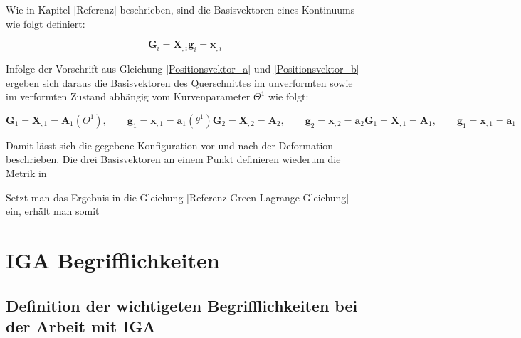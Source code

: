 \documentclass[german,a4paper,12pt,oneside]{scrbook}
\theoremstyle{definition}
\theoremstyle{definition}
\theoremstyle{definition}
\theoremstyle{definition}
\theoremstyle{definition}
\theoremstyle{definition}
\begin{document}
Wie in Kapitel [Referenz] beschrieben, sind die Basisvektoren eines Kontinuums wie folgt definiert:

\begin{subequations}
    \begin{equation}
        \bm{G}_i = \bm{X}_{,i}
    \end{equation}
    \begin{equation}
        \bm{g}_i = \bm{x}_{,i}
    \end{equation}
\end{subequations}

Infolge der Vorschrift aus Gleichung \eqref{Positionsvektor_a} und \eqref{Positionsvektor_b} ergeben sich daraus die Basisvektoren des Querschnittes im unverformten sowie im verformten Zustand abhängig vom Kurvenparameter $\Theta^1$ wie folgt: 

\begin{subequations}
    \begin{equation}
        \bm{G}_1 = \bm{X}_{,1} = \bm{A}_1(\Theta^1), \qquad     
        \bm{g}_1 = \bm{x}_{,1} = \bm{a}_1(\theta^1)
    \end{equation}
    \begin{equation}
        \bm{G}_2 = \bm{X}_{,2} = \bm{A}_2, \qquad     
        \bm{g}_2 = \bm{x}_{,2} = \bm{a}_2
    \end{equation}
    \begin{equation}
        \bm{G}_1 = \bm{X}_{,1} = \bm{A}_1, \qquad     
        \bm{g}_1 = \bm{x}_{,1} = \bm{a}_1
    \end{equation}
\end{subequations}

\vspace{1.0cm}
Damit lässt sich die gegebene Konfiguration vor und nach der Deformation beschrieben. Die drei Basisvektoren an einem Punkt definieren wiederum die Metrik in

Setzt man das Ergebnis in die Gleichung [Referenz Green-Lagrange Gleichung] ein, erhält man somit 





\chapter{IGA Begrifflichkeiten}  \setcounter{page}{1}   %

\section{Definition der wichtigeten Begrifflichkeiten bei der Arbeit mit IGA}
\end{document}
